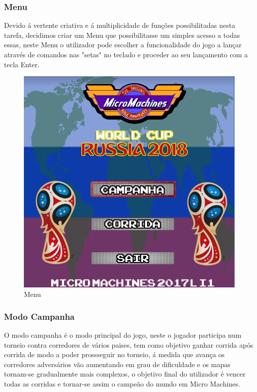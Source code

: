 \documentclass[a4paper]{report} %
\begin{document}
\subsubsection{Menu}
Devido á vertente criativa e á multiplicidade de funções possibilitadas nesta tarefa, decidimos criar um Menu que possibilitasse um simples acesso a todas essas, neste Menu o utilizador pode escolher a funcionalidade do jogo a lançar através de comandos nas "setas" no teclado e proceder ao seu lançamento com a tecla Enter. 
\newpage
\begin{figure}[tb]
\begin{center}
\includegraphics[width=14 cm]{Menu.png}
\end{center}
\caption{Menu}
\end{figure}
\clearpage
\subsubsection{Modo Campanha}
O modo campanha é o modo principal do jogo, neste o jogador participa num torneio contra corredores de vários paises, tem como objetivo ganhar corrida após corrida de modo a poder prossseguir no torneio, á medida que avança os corredores adversários vão aumentando em grau de dificuldade e os mapas tornam-se gradualmente mais complexos, o objetivo final do utilizador é vencer todas as corridas e tornar-se assim o campeão do mundo em Micro Machines.
\end{document}
